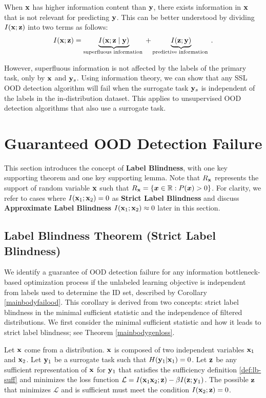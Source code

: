 When ${\mathbf{x}}$ has higher information content than ${\mathbf{y}}$, there exists information in ${\mathbf{x}}$ that is not relevant for predicting ${\mathbf{y}}$. This can be better understood by dividing $I({\mathbf{x}};{\mathbf{z}})$ into two terms \citep{federici2020learning} as follows:
\begin{align}
I({\mathbf{x}} ; {\mathbf{z}})=\underbrace{I({\mathbf{x}} ;{\mathbf{z}} \mid {\mathbf{y}})}_{\text {superfluous information }}+\underbrace{I({\mathbf{z}} ; {\mathbf{y}})}_{\text {predictive information }}. \label{superfluous}
\end{align}

However, superfluous information is not affected by the labels of the primary task, only by ${\mathbf{x}}$ and ${\mathbf{y}}_{s}$. Using information theory, we can show that any SSL OOD detection algorithm will fail when the surrogate task ${\mathbf{y}}_{s}$ is independent of the labels in the in-distribution dataset. This applies to unsupervised OOD detection algorithms that also use a surrogate task.

\section{Guaranteed OOD Detection Failure}

This section introduces the concept of \textbf{Label Blindness}, with one key supporting theorem and one key supporting lemma. Note that $R_{{\mathbf{x}}}$ represents the support of random variable ${\mathbf{x}}$ such that $R_{{\mathbf{x}}} = \{{\bm{x}} \in \mathbb{R} : P({\bm{x}}) > 0\}$. For clarity, we refer to cases where $I({\mathbf{x}}_1; {\mathbf{x}}_2) = 0$ as \textbf{Strict Label Blindness} and discuss \textbf{Approximate Label Blindness} $I({\mathbf{x}}_1; {\mathbf{x}}_2) \approx 0$ later in this section.

\subsection{Label Blindness Theorem (Strict Label Blindness)}

We identify a guarantee of OOD detection failure for any information bottleneck-based optimization process if the unlabeled learning objective is independent from labels used to determine the ID set, described by Corollary \ref{mainbodyfailood}. This corollary is derived from two concepts: strict label blindness in the minimal sufficient statistic and the independence of filtered distributions. We first consider the minimal sufficient statistic and how it leads to strict label blindness; see Theorem \ref{mainbodygenloss}.

\begin{theorem}
    Let ${\mathbf{x}}$ come from a distribution. ${\mathbf{x}}$ is composed of two independent variables ${\mathbf{x}}_1$ and ${\mathbf{x}}_2$. Let ${\mathbf{y}}_1$ be a surrogate task such that $H({\mathbf{y}}_1|{\mathbf{x}}_1) = 0$. Let ${\mathbf{z}}$ be any sufficient representation of ${\mathbf{x}}$ for ${\mathbf{y}}_1$ that satisfies the sufficiency definition \ref{def:lb-suff} and minimizes the loss function $\mathcal{L} = I({\mathbf{x}}_1 {\mathbf{x}}_2; {\mathbf{z}}) - \beta I({\mathbf{z}};{\mathbf{y}}_1)$. The possible ${\mathbf{z}}$ that minimizes $\mathcal{L}$ and is sufficient must meet the condition $I({\mathbf{x}}_2; {\mathbf{z}}) = 0$.
    \label{mainbodygenloss}
\end{theorem}

